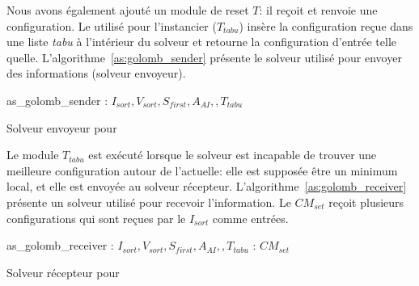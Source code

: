 Nous avons également ajouté un module de reset $T$: il reçoit et renvoie une configuration. Le \om{} utilisé pour l'instancier ($T_{tabu}$) insère la configuration reçue dans une liste \textit{tabu} à l'intérieur du solveur et retourne la configuration d'entrée telle quelle. L'algorithme~\ref{as:golomb_sender} présente le solveur utilisé pour envoyer des informations (solveur envoyeur).

\begin{algorithm}
\dontprintsemicolon
\SetNoline
{}
   as\_golomb\_sender\;
\algoindent{} : $I_{sort}, V_{sort}, S_{first}, A_{AI}, , T_{tabu}$ \; 
\caption{Solveur envoyeur pour  \GRP}\label{as:golomb_sender}
\end{algorithm}

Le module $T_{tabu}$ est exécuté lorsque le solveur est incapable de trouver une meilleure configuration autour de l'actuelle: elle est supposée être un minimum local, et elle est envoyée au solveur récepteur. L'algorithme~\ref{as:golomb_receiver} présente un solveur utilisé pour recevoir l'information. Le \opch{} $CM_{set}$ reçoit plusieurs configurations qui sont reçues par le \om{} $I_{sort}$ comme entrées.
 
\begin{algorithm}
\dontprintsemicolon
\SetNoline
{}
   as\_golomb\_receiver\;
\algoindent{} : $I_{sort}, V_{sort}, S_{first}, A_{AI}, , T_{tabu}$ \; 
\algoindent{}: $CM_{set}$\;
\caption{Solveur récepteur pour \GRP}\label{as:golomb_receiver}
\end{algorithm}

